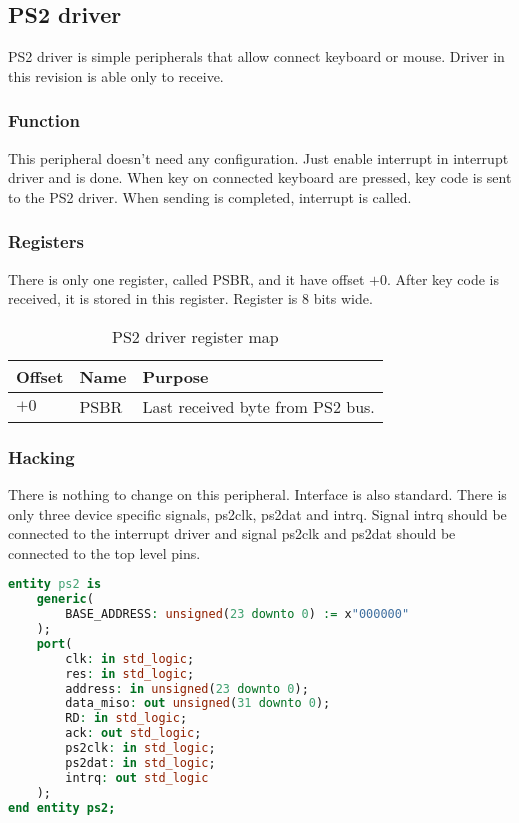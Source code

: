 \subsection{PS2 driver}

PS2 driver is simple peripherals that allow connect keyboard or mouse. Driver
in this revision is able only to receive.

\subsubsection{Function}

This peripheral doesn't need any configuration. Just enable interrupt in interrupt
driver and is done. When key on connected keyboard are pressed, key code is
sent to the PS2 driver. When sending is completed, interrupt is called.

\subsubsection{Registers}

There is only one register, called PSBR, and it have offset $+0$. After key code
is received, it is stored in this register. Register is 8 bits wide.

\begin{table}[h]
    \centering
    \begin{tabular}{|l|l|l|}
        \hline
        \textbf{Offset} & \textbf{Name} & \textbf{Purpose}                 \\ \hline
        $+0$            & PSBR          & Last received byte from PS2 bus. \\ \hline
    \end{tabular}
    \caption{PS2 driver register map}
    \label{tab:ps2_reg_map}
\end{table}

\subsubsection{Hacking}

There is nothing to change on this peripheral. Interface is also standard.
There is only three device specific signals, ps2clk, ps2dat and intrq. Signal
intrq should be connected to the interrupt driver and signal ps2clk and ps2dat
should be connected to the top level pins.

\begin{lstlisting}[language=VHDL, frame=single]
entity ps2 is
    generic(
        BASE_ADDRESS: unsigned(23 downto 0) := x"000000"
    );
    port(
        clk: in std_logic;
        res: in std_logic;
        address: in unsigned(23 downto 0);
        data_miso: out unsigned(31 downto 0);
        RD: in std_logic;
        ack: out std_logic;
        ps2clk: in std_logic;
        ps2dat: in std_logic;
        intrq: out std_logic
    );
end entity ps2;
\end{lstlisting}
